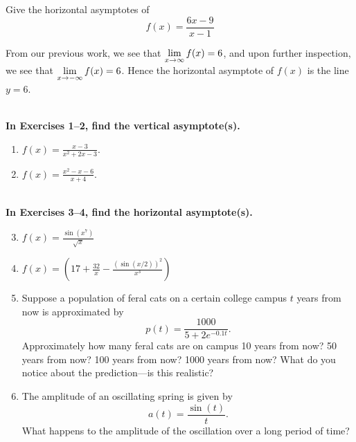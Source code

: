 \begin{example} 
    Give the horizontal asymptotes of
    \[
    f(x) = \frac{6x-9}{x-1}
    \]
    \cite{mooc}
    \begin{solution}
    From our previous work, we see that $\displaystyle\lim\limits_{x\to \infty} f(x) = 6$, and
    upon further inspection, we see that $\displaystyle\lim\limits_{x\to -\infty} f(x) =
    6$. Hence the horizontal asymptote of $f(x)$ is the line $y=6$.
    \end{solution}
\end{example}

\begin{exercise}
    ~\\\-\hspace{0.3cm} \textbf{
        In Exercises 1–2, find the vertical asymptote(s).
    }\cite{mooc}\\
    \begin{enumerate} 
		\item $f(x) = \displaystyle\frac{x-3}{x^2+2x-3}.$
		\item $f(x) = \displaystyle\frac{x^2-x-6}{x+4}.$
    \end{enumerate}
    ~\\\-\hspace{0.3cm} \textbf{
        In Exercises 3–4, find the horizontal asymptote(s).
    }\cite{mooc}\\
    \begin{enumerate}
        \setcounter{enumi}{2}
        \item $f(x) = \displaystyle\frac{\sin\left(x^7\right)}{\sqrt{x}}$
        \item $f(x) = \displaystyle\left(17 + \frac{32}{x} - \frac{\left(\sin(x/2)\right)^2}{x^3}\right)$
        \item Suppose a population of feral cats on a certain college campus $t$
        years from now is approximated by
        $$
        p(t) = \frac{1000}{5+ 2e^{-0.1 t}}.
        $$
        Approximately how many feral cats are on campus 10 years from now? 50 years from now? 100 years from now? 1000 years from now? What do you notice about the prediction---is this realistic? \cite{mooc}
        \item The amplitude of an oscillating spring is given by
        $$
        a(t) = \frac{\sin(t)}{t}.
        $$
        What happens to the amplitude of the oscillation over a long period of time? \cite{mooc}
    \end{enumerate}
\end{exercise}
